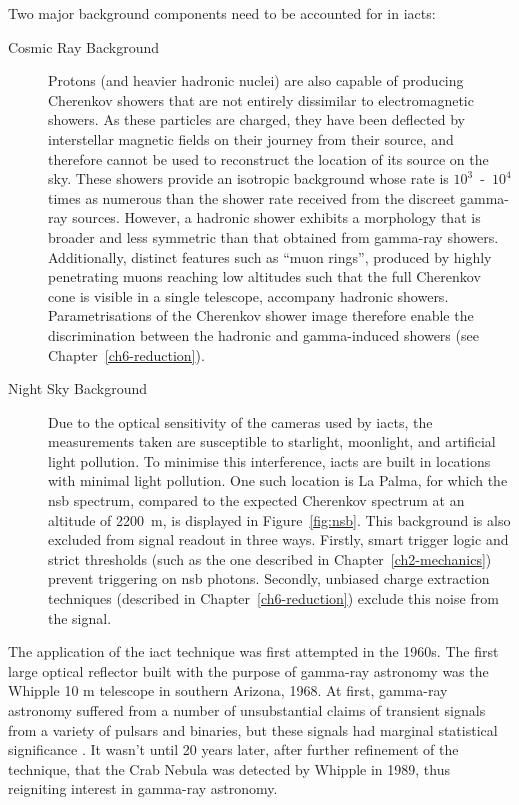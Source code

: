 Two major background components need to be accounted for in \glspl{iact}:
\begin{description}
\item [Cosmic Ray Background] Protons (and heavier hadronic nuclei) are also capable of producing Cherenkov showers that are not entirely dissimilar to electromagnetic showers. As these particles are charged, they have been deflected by interstellar magnetic fields on their journey from their source, and therefore cannot be used to reconstruct the location of its source on the sky. These showers provide an isotropic background whose rate is $10^3$~-~$10^4$ times as numerous than the shower rate received from the discreet gamma-ray sources. However, a hadronic shower exhibits a morphology that is broader and less symmetric than that obtained from gamma-ray showers. Additionally, distinct features such as ``muon rings'', produced by highly penetrating muons reaching low altitudes such that the full Cherenkov cone is visible in a single telescope, accompany hadronic showers. Parametrisations of the Cherenkov shower image therefore enable the discrimination between the hadronic and gamma-induced showers (see Chapter~\ref{ch6-reduction}).
\item [Night Sky Background] Due to the optical sensitivity of the cameras used by \glspl{iact}, the measurements taken are susceptible to starlight, moonlight, and artificial light pollution. To minimise this interference, \glspl{iact} are built in locations with minimal light pollution. One such location is La Palma, for which the \gls{nsb} spectrum, compared to the expected Cherenkov spectrum at an altitude of \SI{2200}{m}, is displayed in Figure~\ref{fig:nsb}. This background is also excluded from signal readout in three ways. Firstly, smart trigger logic and strict thresholds (such as the one described in Chapter~\ref{ch2-mechanics}) prevent triggering on \gls{nsb} photons. Secondly, unbiased charge extraction techniques (described in Chapter~\ref{ch6-reduction}) exclude this noise from the signal.
\end{description}

The application of the \gls{iact} technique was first attempted in the 1960s. The first large optical reflector built with the purpose of gamma-ray astronomy was the Whipple 10 m telescope in southern Arizona, 1968. At first, gamma-ray astronomy suffered from a number of unsubstantial claims of transient signals from a variety of pulsars and binaries, but these signals had marginal statistical significance \cite[][p.~9]{Weekes2003}. It wasn't until 20 years later, after further refinement of the technique, that the Crab Nebula was detected by Whipple in 1989, thus reigniting interest in gamma-ray astronomy.

